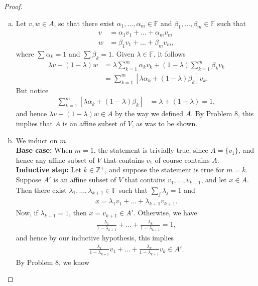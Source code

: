 \documentclass{extarticle}
\newcommand{\Z}{\mathbb{Z}}
\newcommand{\F}{\mathbb{F}}
\begin{document}
\begin{proof}
\begin{enumerate}[(a)]
\item Let $v,w\in A$, so that there exist $\alpha_1,\dots, \alpha_m\in\F$ and $\beta_1,\dots, \beta_m\in\F$ such that
\begin{align*}
v &= \alpha_1v_1 + \dots + \alpha_mv_m\\
w &= \beta_1v_1 + \dots + \beta_mv_m,
\end{align*}
where $\sum \alpha_k = 1$ and $\sum\beta_k = 1$.  Given $\lambda\in\F$, it follows
\begin{align*}
\lambda v + (1 - \lambda)w &= \lambda\sum_{k = 1}^m \alpha_kv_k + (1 - \lambda)\sum_{k = 1}^m\beta_kv_k\\
&= \sum_{k = 1}^m\left[\lambda \alpha_k + (1 - \lambda)\beta_k\right]v_k.
\end{align*}
But notice
\begin{align*}
\sum_{k = 1}^m\left[\lambda \alpha_k + (1 - \lambda)\beta_k\right] &= \lambda + (1 - \lambda) = 1,
\end{align*}
and hence $\lambda v + (1 - \lambda)w \in A$ by the way we defined $A$.  By Problem 8, this implies that $A$ is an affine subset of $V$, as was to be shown.
\item We induct on $m$.\\
\textbf{Base case:} When $m = 1$, the statement is trivially true, since $A = \{v_1\}$, and hence any affine subset of $V$ that contains $v_1$ of course contains $A$.\\
\textbf{Inductive step:} Let $k\in\Z^+$, and suppose the statement is true for $m = k$.  Suppose $A'$ is an affine subset of $V$ that contains $v_1,\dots, v_{k + 1}$, and let $x\in A$.  Then there exist $\lambda_1,\dots, \lambda_{k + 1}\in\F$ such that $\sum_{j}\lambda_j = 1$ and
\begin{align*}
x = \lambda_1v_1 + \dots + \lambda_{k+1}v_{k+1}.
\end{align*}
Now, if $\lambda_{k + 1} = 1$, then $x = v_{k + 1}\in A'$.  Otherwise, we have
\begin{align*}
\frac{\lambda_1}{1 - \lambda_{k + 1}} + \dots + \frac{\lambda_{k}}{1-\lambda_{k + 1}} = 1,
\end{align*}
and hence by our inductive hypothesis, this implies
\begin{align*}
\frac{\lambda_1}{1 - \lambda_{k + 1}}v_1 + \dots + \frac{\lambda_{k}}{1-\lambda_{k + 1}}v_k \in A'.
\end{align*}
By Problem 8, we know

\end{enumerate}
\end{proof}
\end{document}
